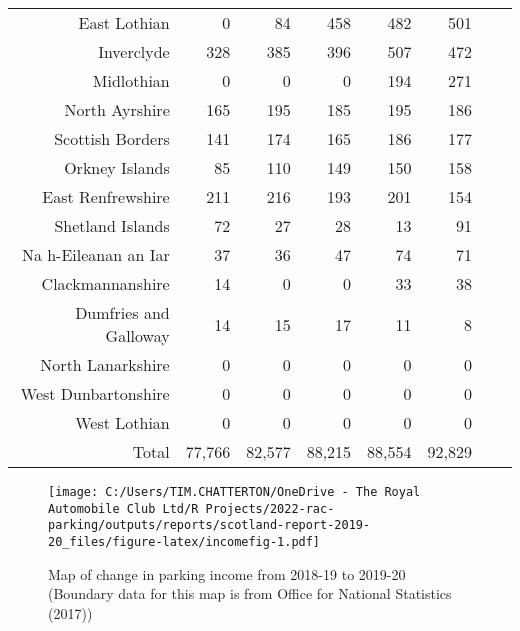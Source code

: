 \documentclass[
  12pt,
]{article}
\begin{document}
\begin{longtable}[t]{rrrrrrrr}
East Lothian & 0 & 84 & 458 & 482 & 501 & \cellcolor{white}{  3.9\%} & \cellcolor{white}{}\\
Inverclyde & 328 & 385 & 396 & 507 & 472 & \cellcolor{white}{ -6.9\%} & \cellcolor{white}{  9.5\%}\\
Midlothian & 0 & 0 & 0 & 194 & 271 & \cellcolor{white}{ 39.7\%} & \cellcolor{white}{}\\
North Ayrshire & 165 & 195 & 185 & 195 & 186 & \cellcolor{white}{ -4.6\%} & \cellcolor{white}{  3.0\%}\\
Scottish Borders & 141 & 174 & 165 & 186 & 177 & \cellcolor{white}{ -4.8\%} & \cellcolor{white}{  5.8\%}\\
Orkney Islands & 85 & 110 & 149 & 150 & 158 & \cellcolor{white}{  5.3\%} & \cellcolor{white}{ 16.8\%}\\
East Renfrewshire & 211 & 216 & 193 & 201 & 154 & \cellcolor{white}{-23.4\%} & \cellcolor{white}{ -7.6\%}\\
Shetland Islands & 72 & 27 & 28 & 13 & 91 & \cellcolor{white}{600.0\%} & \cellcolor{white}{  6.0\%}\\
Na h-Eileanan an Iar & 37 & 36 & 47 & 74 & 71 & \cellcolor{white}{ -4.1\%} & \cellcolor{white}{ 17.7\%}\\
Clackmannanshire & 14 & 0 & 0 & 33 & 38 & \cellcolor{white}{ 15.2\%} & \cellcolor{white}{ 28.4\%}\\
Dumfries and Galloway & 14 & 15 & 17 & 11 & 8 & \cellcolor{white}{-27.3\%} & \cellcolor{white}{-13.1\%}\\
North Lanarkshire & 0 & 0 & 0 & 0 & 0 & \cellcolor{white}{  0.0\%} & \cellcolor{white}{  0.0\%}\\
West Dunbartonshire & 0 & 0 & 0 & 0 & 0 & \cellcolor{white}{  0.0\%} & \cellcolor{white}{  0.0\%}\\
West Lothian & 0 & 0 & 0 & 0 & 0 & \cellcolor{white}{  0.0\%} & \cellcolor{white}{  0.0\%}\\
\midrule
Total & 77,766 & 82,577 & 88,215 & 88,554 & 92,829 & \cellcolor{white}{  4.8\%} & \cellcolor{white}{  4.5\%}\\*
\end{longtable}
\endgroup{}

\begin{figure}
\centering
\texttt{[image: C:/Users/TIM.CHATTERTON/OneDrive - The Royal Automobile Club Ltd/R Projects/2022-rac-parking/outputs/reports/scotland-report-2019-20\_files/figure-latex/incomefig-1.pdf]}
\caption{\label{fig:incomefig}Map of change in parking income from 2018-19 to 2019-20 (Boundary data for this map is from Office for National Statistics (2017))}
\end{figure}
\end{document}
